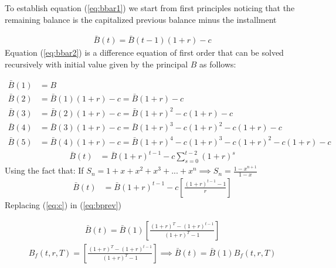 To establish equation (\ref{eq:bbar1}) we start from first principles noticing that 
the remaining balance is the capitalized previous balance minus the installment 

\begin{align}
\bar{B}(t)=\bar{B}(t-1)(1+r)-c \label{eq:bbar2}
\end{align}
Equation (\ref{eq:bbar2}) is a difference equation of first order that can be solved recursively with initial value given by the principal $B$ as follows:

\begin{align}
    \bar{B}(1)&=B \nonumber \\
    \bar{B}(2)&=\bar{B}(1)(1+r)-c = \bar{B}(1+r)-c \nonumber \\
    \bar{B}(3)&=\bar{B}(2)(1+r)-c = \bar{B}(1+r)^2-c(1+r)-c \nonumber \\
    \bar{B}(4)&=\bar{B}(3)(1+r)-c = \bar{B}(1+r)^3-c(1+r)^2-c(1+r)-c \nonumber \\
    \bar{B}(5)&=\bar{B}(4)(1+r)-c = \bar{B}(1+r)^4-c(1+r)^3-c(1+r)^2-c(1+r)-c \nonumber 
\end{align}  
\begin{align}
    \bar{B}(t)&= \bar{B}(1+r)^{t-1}-c \sum_{s=0}^{t-2} (1+r)^s 
\end{align}
Using the fact that: If $S_n = 1+x+x^2+x^3+...+x^n \implies  S_n=\frac{1-x^{n+1}}{1-x}$
\begin{align}
    \bar{B}(t)&= \bar{B}(1+r)^{t-1}-c \left[ \frac{(1+r)^{t-1}-1}{r} \right]  \label{eq:bprev}
\end{align}
Replacing (\ref{eq:c}) in (\ref{eq:bprev})

\begin{align}
    \bar{B}(t)=\bar{B}(1)\left[ \frac{(1+r)^T-(1+r)^{t-1}}{(1+r)^T-1} \right]
\end{align}
\begin{align}
    \boxed{B_f(t,r,T)=\left[ \frac{(1+r)^T-(1+r)^{t-1}}{(1+r)^T-1} \right]} \implies \bar{B}(t)=\bar{B}(1)B_f(t,r,T)
\end{align}
